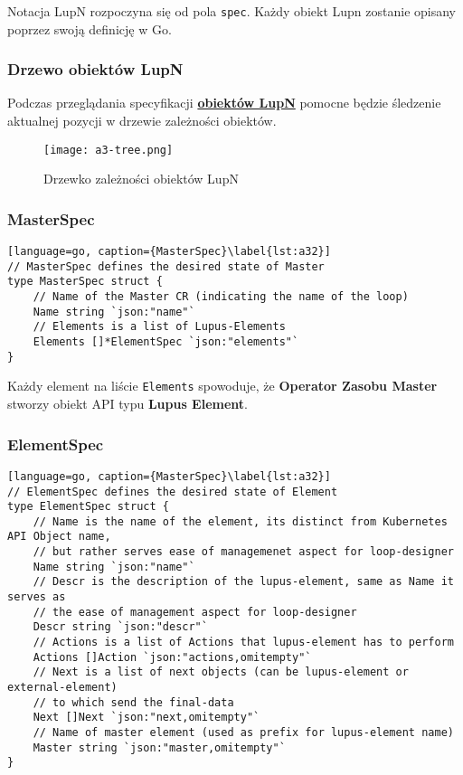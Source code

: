 Notacja LupN rozpoczyna się od pola \texttt{spec}. Każdy obiekt Lupn zostanie opisany poprzez swoją definicję w Go.

\subsubsection{Drzewo obiektów LupN}

Podczas przeglądania specyfikacji \hyperlink{def:obiekt-lupn}{\textbf{obiektów LupN}} pomocne będzie śledzenie aktualnej pozycji w drzewie zależności obiektów. 

\begin{figure}[!h]
    \centering \texttt{[image: a3-tree.png]}
    \caption{Drzewko zależności obiektów LupN}\label{fig:a3-tree}
\end{figure}

\subsubsection{MasterSpec}
\begin{lstlisting}[language=go, caption={MasterSpec}\label{lst:a32}]
// MasterSpec defines the desired state of Master
type MasterSpec struct {
	// Name of the Master CR (indicating the name of the loop)
	Name string `json:"name"`
	// Elements is a list of Lupus-Elements
	Elements []*ElementSpec `json:"elements"`
}
\end{lstlisting}
Każdy element na liście \texttt{Elements} spowoduje, że \textbf{Operator Zasobu Master} stworzy obiekt API typu \textbf{Lupus Element}. 

\subsubsection{ElementSpec}
\begin{lstlisting}[language=go, caption={MasterSpec}\label{lst:a32}]
// ElementSpec defines the desired state of Element
type ElementSpec struct {
	// Name is the name of the element, its distinct from Kubernetes API Object name, 
    // but rather serves ease of managemenet aspect for loop-designer
	Name string `json:"name"`
	// Descr is the description of the lupus-element, same as Name it serves as 
    // the ease of management aspect for loop-designer
	Descr string `json:"descr"`
	// Actions is a list of Actions that lupus-element has to perform
	Actions []Action `json:"actions,omitempty"`
	// Next is a list of next objects (can be lupus-element or external-element) 
    // to which send the final-data
	Next []Next `json:"next,omitempty"`
	// Name of master element (used as prefix for lupus-element name)
	Master string `json:"master,omitempty"`
}
\end{lstlisting}

